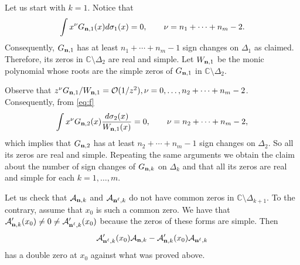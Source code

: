 \documentclass{amsart}
\theoremstyle{definition}
\theoremstyle{remark}
\begin{document}
Let us start with $k=1$. Notice that
\[\int x^\nu G_{{\bf n},1}(x) d \sigma_1 (x)  = 0, \qquad \nu =  n_1+\cdots+n_m -2.
\]
Consequently, $G_{{\bf n},1}$ has at least $n_1+\cdots+n_m -1$ sign changes on $\Delta_1$ as claimed. Therefore, its zeros in $\mathbb{C} \setminus \Delta_2$ are real and simple. Let $W_{{\bf n},1}$ be the monic polynomial whose roots are the simple zeros of $G_{{\bf n},1}$ in $\mathbb{C} \setminus \Delta_2$.

Observe that $z^{\nu} G_{{\bf n},1}/W_{{\bf n},1} ={\mathcal{O}}(1/z^2), \nu = 0,\ldots,n_2+\cdots+n_m -2$. Consequently, from \eqref{eq:f}
\[
\int x^\nu G_{{\bf n},2}(x) \frac{d \sigma_2 (x)}{W_{{\bf n},1}(x)} = 0, \qquad \nu =  n_2+\cdots+n_m -2,
\]
which implies that $G_{{\bf n},2}$ has at least $n_2+\cdots+n_m -1$ sign changes on $\Delta_2$. So all its zeros are real and simple. Repeating the same arguments we obtain the claim about the number of sign changes of $G_{{\bf n},k}$ on $\Delta_k$ and that all its zeros are real and simple for each $k=1,\ldots,m$.

Let us check that ${\mathcal{A}}_{{\bf n},k}$ and ${\mathcal{A}}_{{\bf n}^\ell,k}$ do not have common zeros in ${\mathbb{C}}\setminus \Delta_{k+1}$. To the contrary, assume that $x_0$ is such a common zero. We have that ${\mathcal{A}}_{{\bf n},k}'(x_0) \neq 0 \neq {\mathcal{A}}_{{\bf n}^\ell,k}'(x_0)$ because the zeros of these forms are simple. Then
\[{\mathcal{A}}_{{\bf n}^\ell,k}'(x_0){\mathcal{A}}_{{\bf n},k} -  {\mathcal{A}}_{{\bf n},k}'(x_0){\mathcal{A}}_{{\bf n}^\ell,k}\]
has a double zero at $x_0$ against what was proved above.
\end{document}
